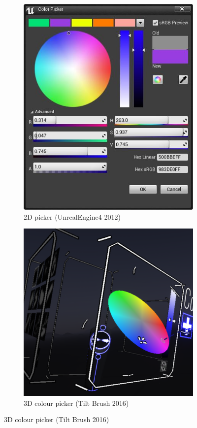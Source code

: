 \documentclass[11pt]{article}
\begin{document}
\begin{figure}
\centering
\begin{subfigure}{.5\textwidth}
  \centering
  \includegraphics[width=.82\linewidth]{2dui.jpg}
  \caption{2D picker (UnrealEngine4 2012)}
\end{subfigure}%
\begin{subfigure}{.5\textwidth}
  \centering
  \includegraphics[width=1\linewidth]{3dui.png}
  \caption{3D colour picker (Tilt Brush 2016)}
\end{subfigure}
\end{figure}
\end{document}

